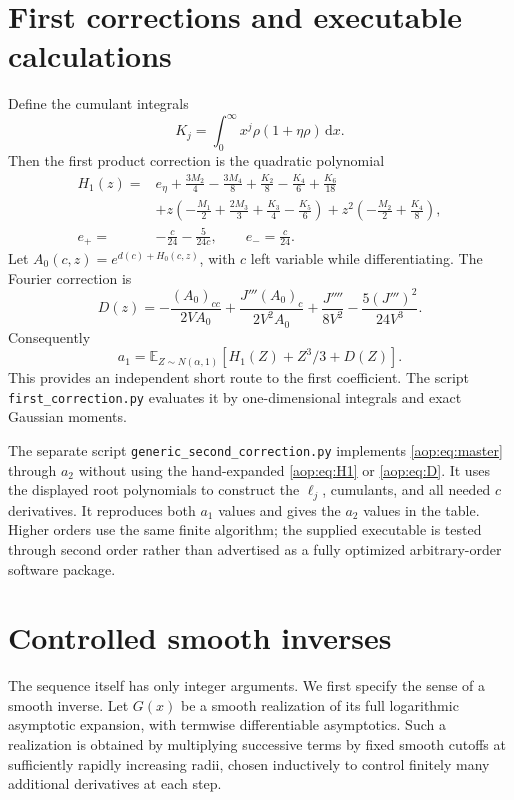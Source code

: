 \documentclass[11pt]{article}
\theoremstyle{remark}\newtheorem{remark}[theorem]{Remark}
\newcommand{\E}{\mathbb E}
\newcommand{\dd}{\,\mathrm d}
\begin{document}
\section{First corrections and executable calculations}\label{aop:sec:first}

Define the cumulant integrals
\[
 K_j=\int_0^\infty x^j\rho(1+\eta\rho)\dd x.
\]
Then the first product correction is the quadratic polynomial
\begin{align}
 H_1(z)={}&e_\eta+\frac{3M_2}{4}-\frac{3M_4}{8}
            +\frac{K_2}{8}-\frac{K_4}{6}+\frac{K_6}{18}\nonumber\\
 &+z\left(-\frac{M_1}{2}+\frac{2M_3}{3}
                         +\frac{K_3}{4}-\frac{K_5}{6}\right)
 +z^2\left(-\frac{M_2}{2}+\frac{K_4}{8}\right),\label{aop:eq:H1}\\
 e_+={}&-\frac c{24}-\frac5{24c},\qquad e_- =\frac c{24}.
 \nonumber
\end{align}
Let $A_0(c,z)=e^{d(c)+H_0(c,z)}$, with $c$ left variable while
differentiating. The Fourier correction is
\begin{equation}\label{aop:eq:D}
 D(z)=-\frac{(A_0)_{cc}}{2VA_0}
 +\frac{J'''(A_0)_c}{2V^2A_0}
 +\frac{J''''}{8V^2}-\frac{5(J''')^2}{24V^3}.
\end{equation}
Consequently
\begin{equation}\label{aop:eq:a1}
 a_1=\E_{Z\sim N(\alpha,1)}\left[H_1(Z)+Z^3/3+D(Z)\right].
\end{equation}
This provides an independent short route to the first coefficient.
The script \texttt{first\_correction.py} evaluates it by
one-dimensional integrals and exact Gaussian moments.

The separate script \texttt{generic\_second\_correction.py} implements
\eqref{aop:eq:master} through $a_2$ without using the hand-expanded
\eqref{aop:eq:H1} or \eqref{aop:eq:D}. It uses the displayed root polynomials
to construct the $\ell_j$, cumulants, and all needed $c$ derivatives. It
reproduces both $a_1$ values and gives the $a_2$ values in the table.
Higher orders use the same finite algorithm; the supplied executable
is tested through second order rather than advertised as a fully
optimized arbitrary-order software package.

\section{Controlled smooth inverses}\label{aop:sec:inverse}

The sequence itself has only integer arguments. We first specify the
sense of a smooth inverse. Let $G(x)$ be a smooth realization of its
full logarithmic asymptotic expansion, with termwise differentiable
asymptotics. Such a realization is obtained by multiplying successive
terms by fixed smooth cutoffs at sufficiently rapidly increasing
radii, chosen inductively to control finitely many additional
derivatives at each step.
\end{document}
